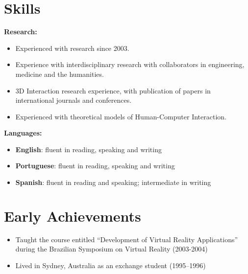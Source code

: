 \documentclass[wideaddress]{vitae}
\newcommand{\resitem}[1]{
	\item \begin{flushleft} #1 \end{flushleft}
}
\newcommand{\ressubitem}[1]{
	\item \begin{flushleft} #1 \end{flushleft}
}
\newenvironment{reslist}[1]{
	\resitem{\textbf{#1}}
	\begin{itemize}
}{
	\end{itemize}
}
\begin{document}
\section{Skills}
\begin{description}
	\begin{reslist}{Research:}
		\ressubitem{Experienced with research since 2003.}
		\ressubitem{Experience with interdisciplinary research with collaborators in engineering, medicine and the humanities.}
		\ressubitem{3D Interaction research experience, with publication of papers in international journals and conferences.}
		\ressubitem{Experienced with theoretical models of Human-Computer Interaction.}
	\end{reslist}
	\begin{reslist}{Languages:}
		\ressubitem{\textbf{English}: fluent in reading, speaking and writing}
		\ressubitem{\textbf{Portuguese}: fluent in reading, speaking and writing}
		\ressubitem{\textbf{Spanish}: fluent in reading and speaking; intermediate in writing}
	\end{reslist}
\end{description}

\section{Early Achievements}
\begin{itemize}
	\item{Taught the course entitled ``Development of Virtual Reality Applications'' during the Brazilian Symposium on Virtual Reality (2003-2004)}
	\item{Lived in Sydney, Australia as an exchange student  (1995--1996)}
\end{itemize}

%


\end{document}
